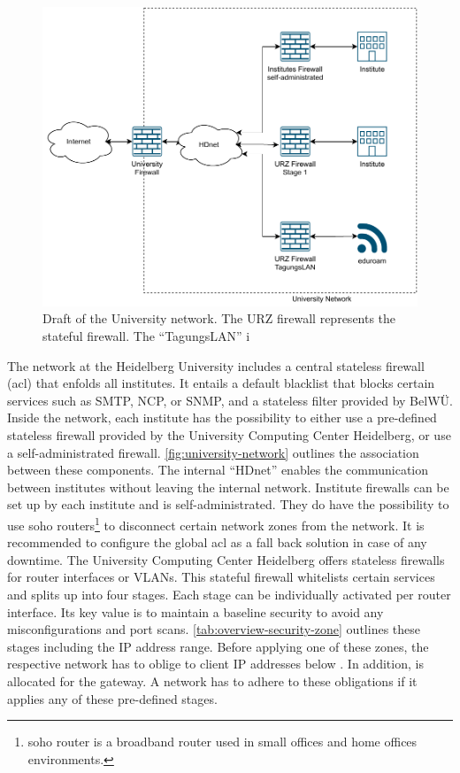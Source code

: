\begin{figure}[ht]
    \centering
    \includegraphics[width=\textwidth]{figures/university-network.pdf}
    \caption[Draft of the University network]{Draft of the University network. The URZ firewall represents the stateful firewall. The \enquote{TagungsLAN} i}
    \label{fig:university-network}
\end{figure}

The network at the Heidelberg University includes a central stateless firewall (\ac{acl}) that enfolds all institutes.
It entails a default blacklist that blocks certain services such as SMTP, NCP, or SNMP, and a stateless filter provided by BelWÜ.
Inside the network, each institute has the possibility to either use a pre-defined stateless firewall provided by the University Computing Center Heidelberg, or use a self-administrated firewall.
\autoref{fig:university-network} outlines the association between these components.
The internal \enquote{HDnet} enables the communication between institutes without leaving the internal network.
Institute firewalls can be set up by each institute and is self-administrated.
They do have the possibility to use \ac{soho} routers\footnote{\ac{soho} router is a broadband router used in small offices and home offices environments.} to disconnect certain network zones from the network.
It is recommended to configure the global \ac{acl} as a fall back solution in case of any downtime.
The University Computing Center Heidelberg offers stateless firewalls for router interfaces or VLANs.
This stateful firewall whitelists certain services and splits up into four stages.
Each stage can be individually activated per router interface.
Its key value is to maintain a baseline security to avoid any misconfigurations and port scans.
\autoref{tab:overview-security-zone} outlines these stages including the IP address range.
Before applying one of these zones, the respective network has to oblige to client IP addresses below .
In addition,  is allocated for the gateway.
A network has to adhere to these obligations if it applies any of these pre-defined stages.

